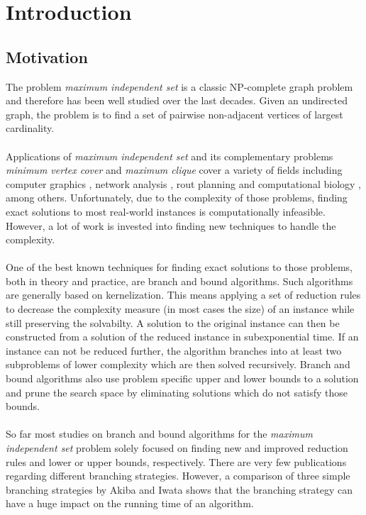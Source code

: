 \documentclass[]{article}
\title{}
\author{}
\begin{document}



\section{Introduction} \label{sec1}
\subsection{Motivation}
The problem \textit{maximum independent set} is a classic NP-complete graph problem \cite{GareyJohnson} and therefore has been well studied over the last decades. Given an undirected graph, the problem is to find a set of pairwise non-adjacent vertices of largest cardinality.\\\\
Applications of \textit{maximum independent set} and its complementary problems \textit{minimum vertex cover} and \textit{maximum clique} cover a variety of fields including computer graphics \cite{CG}, network analysis \cite{NW}, rout planning \cite{RP} and computational biology \cite{BIO1, BIO2}, among others. Unfortunately, due to the complexity of those problems, finding exact solutions to most real-world instances is computationally infeasible. However, a lot of work is invested into finding new techniques to handle the complexity. \\\\
One of the best known techniques for finding exact solutions to those problems, both  in theory and practice, are branch and bound algorithms. Such algorithms are generally based on kernelization. This means applying a set of reduction rules to decrease the complexity measure (in most cases the size) of an instance while still preserving the solvabilty. A solution to the original instance can then be constructed from a solution of the reduced instance in subexponential time. If an instance can not be reduced further, the algorithm branches into at least two subproblems of lower complexity which are then solved recursively. Branch and bound algorithms also use problem specific upper and lower bounds to a solution and prune the search space by eliminating solutions which do not satisfy those bounds. \\\\
So far most studies on branch and bound algorithms for the \textit{maximum independent set} problem solely focused on finding new and improved reduction rules and lower or upper bounds, respectively. There are very few publications regarding different branching strategies. However, a comparison of three simple branching strategies by Akiba and Iwata \cite{AkibaIwata} shows that the branching strategy can have a huge impact on the running time of an algorithm.
\end{document}
